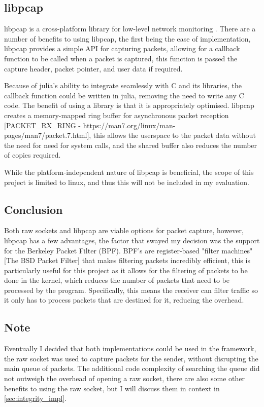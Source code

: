 \subsection{libpcap}

libpcap is a cross-platform library for low-level network monitoring \cite{libpcap}. 
There are a number of benefits to using libpcap, the first being the ease of implementation, libpcap provides a simple API for capturing packets, allowing for a callback function to be called when a packet is captured, this function is passed the capture header, packet pointer, and user data if required.

Because of julia's ability to integrate seamlessly with C and its libraries, the callback function could be written in julia, removing the need to write any C code. The benefit of using a library is that it is appropriately optimised. libpcap creates a memory-mapped ring buffer for asynchronous packet reception [PACKET\_RX\_RING - https://man7.org/linux/man-pages/man7/packet.7.html], this allows the userspace to the packet data without the need for need for system calls, and the shared buffer also reduces the number of copies required.

While the platform-independent nature of libpcap is beneficial, the scope of this project is limited to linux, and thus this will not be included in my evaluation.

\subsection{Conclusion}

Both raw sockets and libpcap are viable options for packet capture, however, libpcap has a few advantages, the factor that swayed my decision was the support for the Berkeley Packet Filter (BPF). BPF's are register-based "filter machines" [The BSD Packet Filter] that makes filtering packets incredibly efficient, this is particularly useful for this project as it allows for the filtering of packets to be done in the kernel, which reduces the number of packets that need to be processed by the program. Specifically, this means the receiver can filter traffic so it only has to process packets that are destined for it, reducing the overhead.

\subsection{Note}

Eventually I decided that both implementations could be used in the framework, the raw socket was used to capture packets for the sender, without disrupting the main queue of packets. The additional code complexity of searching the queue did not outweigh the overhead of opening a raw socket, there are also some other benefits to using the raw socket, but I will discuss them in context in \ref{sec:integrity_impl}.

